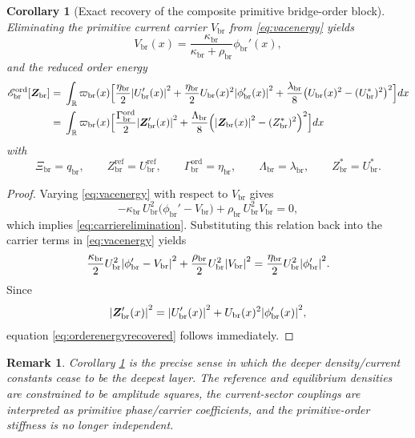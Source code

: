 \documentclass[11pt]{article}
\newcommand{\ProfWeight}{\varpi_{\mathrm{br}}}
\newcommand{\RespOrderField}{\bm Z_{\mathrm{br}}}
\newcommand{\RespOrderRef}{Z_{\mathrm{br}}^{\mathrm{ref}}}
\newcommand{\RespOrderEq}{Z_{\mathrm{br}}^{\ast}}
\newcommand{\RespOrderReadout}{\Xi_{\mathrm{br}}}
\newcommand{\RespOrderStiff}{\Gamma_{\mathrm{br}}^{\mathrm{ord}}}
\newcommand{\RespOrderQuartic}{\Lambda_{\mathrm{br}}}
\newcommand{\RespOrderEnergy}{\mathscr E_{\mathrm{br}}^{\mathrm{ord}}}
\newcommand{\RespVacAmp}{U_{\mathrm{br}}}
\newcommand{\RespVacRef}{U_{\mathrm{br}}^{\mathrm{ref}}}
\newcommand{\RespVacEq}{U_{\mathrm{br}}^{\ast}}
\newcommand{\RespVacPhase}{\phi_{\mathrm{br}}}
\newcommand{\RespVacCarrier}{V_{\mathrm{br}}}
\newcommand{\RespVacReadout}{q_{\mathrm{br}}}
\newcommand{\RespVacCov}{\kappa_{\mathrm{br}}}
\newcommand{\RespVacRelax}{\rho_{\mathrm{br}}}
\newcommand{\RespVacWell}{\lambda_{\mathrm{br}}}
\newcommand{\RespVacIso}{\eta_{\mathrm{br}}}
\newtheorem{remark}{Remark}
\newtheorem{corollary}{Corollary}
\begin{document}
\begin{corollary}[Exact recovery of the composite primitive bridge-order block]
\label{cor:orderrecovery}
Eliminating the primitive current carrier \(\RespVacCarrier\) from \eqref{eq:vacenergy} yields
\begin{equation}
\RespVacCarrier(x)=\frac{\RespVacCov}{\RespVacCov+\RespVacRelax}\RespVacPhase'(x),
\label{eq:carrierelimination}
\end{equation}
and the reduced order energy
\begin{align}
\RespOrderEnergy[\RespOrderField]
=\;&
\int_{\mathbb R}\ProfWeight(x)\Bigl[
\frac{\RespVacIso}{2}\abs{\RespVacAmp'(x)}^2
+
\frac{\RespVacIso}{2}\RespVacAmp(x)^2\abs{\RespVacPhase'(x)}^2
+
\frac{\RespVacWell}{8}\bigl(\RespVacAmp(x)^2-(\RespVacEq)^2\bigr)^2
\Bigr]dx
\nonumber\\
=\;&
\int_{\mathbb R}\ProfWeight(x)\Bigl[
\frac{\RespOrderStiff}{2}\abs{\RespOrderField'(x)}^2
+
\frac{\RespOrderQuartic}{8}\Bigl(\abs{\RespOrderField(x)}^2-(\RespOrderEq)^2\Bigr)^2
\Bigr]dx
\label{eq:orderenergyrecovered}
\end{align}
with
\begin{equation}
\RespOrderReadout=\RespVacReadout,
\qquad
\RespOrderRef=\RespVacRef,
\qquad
\RespOrderStiff=\RespVacIso,
\qquad
\RespOrderQuartic=\RespVacWell,
\qquad
\RespOrderEq=\RespVacEq.
\label{eq:orderfromvac}
\end{equation}
\end{corollary}

\begin{proof}
Varying \eqref{eq:vacenergy} with respect to \(\RespVacCarrier\) gives
\[
-\RespVacCov\,\RespVacAmp^2\bigl(\RespVacPhase'-\RespVacCarrier\bigr)
+\RespVacRelax\,\RespVacAmp^2\RespVacCarrier
=0,
\]
which implies \eqref{eq:carrierelimination}. Substituting this relation back into the carrier terms in \eqref{eq:vacenergy} yields
\[
\frac{\RespVacCov}{2}\RespVacAmp^2\abs{\RespVacPhase'-\RespVacCarrier}^2
+
\frac{\RespVacRelax}{2}\RespVacAmp^2\abs{\RespVacCarrier}^2
=
\frac{\RespVacIso}{2}\RespVacAmp^2\abs{\RespVacPhase'}^2.
\]
Since
\[
\abs{\RespOrderField'(x)}^2
=
\abs{\RespVacAmp'(x)}^2
+
\RespVacAmp(x)^2\abs{\RespVacPhase'(x)}^2,
\]
equation \eqref{eq:orderenergyrecovered} follows immediately.
\end{proof}

\begin{remark}
Corollary \ref{cor:orderrecovery} is the precise sense in which the deeper density/current constants cease to be the deepest layer. The reference and equilibrium densities are constrained to be amplitude squares, the current-sector couplings are interpreted as primitive phase/carrier coefficients, and the primitive-order stiffness is no longer independent.
\end{remark}
\end{document}

